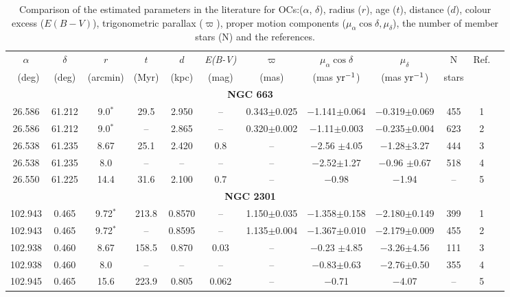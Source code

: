 \documentclass[referee]{raa}            %
\begin{document}
\begin{table}[ht]
\centering
\renewcommand{\arraystretch}{0.75}
\footnotesize
\caption{Comparison of the estimated parameters in the literature for OCs:($\alpha$, $ \delta$), radius ($r$), age ($t$), distance ($d$), colour excess ($E(B - V)$), trigonometric parallax ($\varpi$), proper motion components ($\mu_\alpha \cos \delta, \mu_\delta$), the number of member stars (N) and the references.
\label{tab:literature}}    
\setlength\tabcolsep{0.8pt}
\begin{tabular}{cccccccccccc}
\toprule
$\alpha $ &  $\delta$  &  $r$ & $t$  & $d$ & \it E(B-V) & $ \varpi$ &  $ \mu _\alpha \cos \delta$ & $ \mu _\delta$  & N & Ref.  \\
\ (deg) & (deg) &  (arcmin) & (Myr) & (kpc) & (mag) & (mas) &  (mas $\rm yr^{-1}$) & (mas $\rm yr^{-1}$)& stars & \\
\hline\hline
\multicolumn{11}{c}{\textbf{NGC 663}}\\
\midrule
26.586  & 61.212  & 9.0$^*$   & 29.5 & 2.950 & --& 0.343$\pm$0.025 & $-$1.141$\pm$0.064 &  $-$0.319$\pm$0.069& 455&1 \\
% 
26.586  & 61.212  & 9.0$^*$ & -- & 2.865 &--& 0.320$\pm$0.002&$-$1.11$\pm$0.003& $-$0.235$\pm$0.004 & 623 & 2 \\
%
%
26.538 &	61.235 & 8.67 &  25.1 & 2.420 &0.8&--& $-$2.56	$\pm$4.05  &$-$1.28$\pm$3.27& 444 &3 \\
%
26.538 & 61.235 & 8.0  & -- & -- & -- &--& $-$2.52$\pm$1.27 & $-$0.96 $\pm$0.67
 & 518 &4\\
%
26.550 & 61.225 & 14.4  & 31.6 & 2.100 & 0.7  &--& $-$0.98 & $-$1.94  & -- &5 \\
\hline\hline
\multicolumn{11}{c}{\textbf{NGC 2301}}\\
\midrule
102.943  & 0.465  & 9.72$^*$   & 213.8 & 0.8570 & --& 1.150$\pm$0.035 & $-$1.358$\pm$0.158 &  $-$2.180$\pm$0.149& 399 &1 \\
% 
102.943 & 0.465  & 9.72$^*$ & -- & 0.8595 &--& 1.135$\pm$0.004&$-$1.367$\pm$0.010 & $-$2.179$\pm$0.009 & 455 & 2 \\
%
%
102.938 & 	0.460 & 8.67 &  158.5 & 0.870 &0.03 &--& $-$0.23	$\pm$4.85  &$-$3.26$\pm$4.56& 111 &3 \\
%
102.938  & 0.460 & 8.0  & -- & -- & -- &--& $-$0.83$\pm$0.63 & $-$2.76$\pm$0.50
 & 355 &4 \\
%
102.945 & 0.465 & 15.6  & 223.9 & 0.805 & 0.062   &--& $-$0.71 & $-$4.07  & -- &5 \\


\end{tabular}
\end{table}
\end{document}
